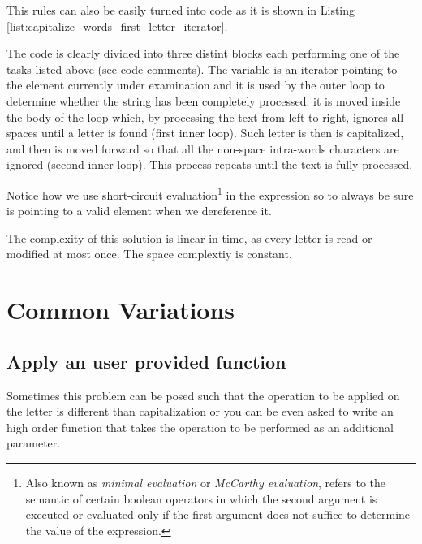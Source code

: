 This rules can also be easily turned into code as it is shown in Listing \ref{list:capitalize_words_first_letter_iterator}.



The code is clearly divided into three distint blocks each performing one of the tasks listed above (see code comments).
The variable  is an iterator pointing to the  element currently under examination and it is used by the outer loop to determine whether the string has been completely processed.
 it is moved inside the body of the loop which, by processing the text from left to right, ignores all spaces until a letter is found (first inner loop). Such letter is then is capitalized, and then  is moved forward so that all the non-space intra-words characters are ignored (second inner loop). This process repeats until the text is fully processed. 

Notice how we use short-circuit evaluation\footnote{
	Also known as \textit{minimal evaluation} or \textit{McCarthy evaluation}, refers to the semantic of certain boolean operators in which the second argument is executed or evaluated only if the first argument does not suffice to determine the value of the expression.}\cite{cit:wiki:shortcircuit}
in the  expression so to always be sure  is pointing to a valid element when we dereference it.

The complexity of this solution is linear in time, as every letter is read or modified at most once. The space complextiy is constant.



\section{Common Variations}
\label{capitalize_words_first_letter:sec:variation}

\subsection{Apply an user provided function}
Sometimes this problem can be posed such that the operation to be applied on the letter is different than capitalization or you can be even asked to write an high order function that takes the operation to be performed as an additional parameter.

